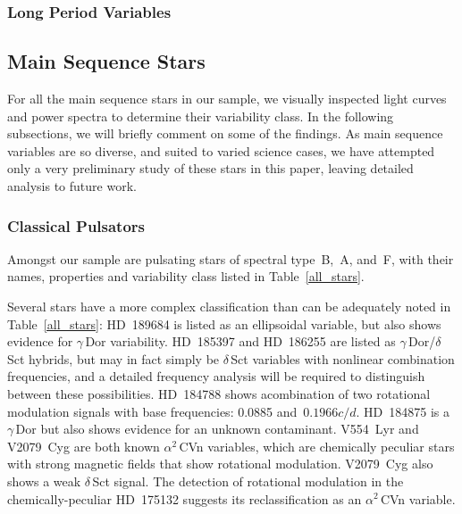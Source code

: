 \documentclass[a4paper,fleqn,usenatbib]{mnras}
\begin{document}
\subsubsection{Long Period Variables}
\label{lpvs}

\subsection{Main Sequence Stars}
\label{mainseq}

For all the main sequence stars in our sample, we visually inspected light curves and power spectra to determine their variability class. In the following subsections, we will briefly comment on some of the findings. As main sequence variables are so diverse, and suited to varied science cases, we have attempted only a very preliminary study of these stars in this paper, leaving detailed analysis to future work.

\subsubsection{Classical Pulsators}
\label{pulsators}

Amongst our sample are pulsating stars of spectral type~B,~A, and~F, with their names, properties and variability class listed in Table~\ref{all_stars}. 

Several stars have a more complex classification than can be adequately noted in Table~\ref{all_stars}: HD~189684 is listed as an ellipsoidal variable, but also shows evidence for $\gamma$\,Dor variability. HD~185397 and HD~186255 are listed as $\gamma$\,Dor/$\delta$\,Sct hybrids, but may in fact simply be $\delta$\,Sct variables with nonlinear combination frequencies, and a detailed frequency analysis will be required to distinguish between these possibilities. HD~184788 shows acombination of two rotational modulation signals with base frequencies: 0.0885 and~$0.1966 c/d$. HD~184875 is a $\gamma$\,Dor but also shows evidence for an unknown contaminant. V554~Lyr and V2079~Cyg are both known $\alpha^2$\,CVn variables, which are chemically peculiar stars with strong magnetic fields that show rotational modulation. V2079~Cyg also shows a weak $\delta$\,Sct signal. The detection of rotational modulation in the chemically-peculiar HD~175132 suggests its reclassification as an $\alpha^2$\,CVn variable.
\end{document}
